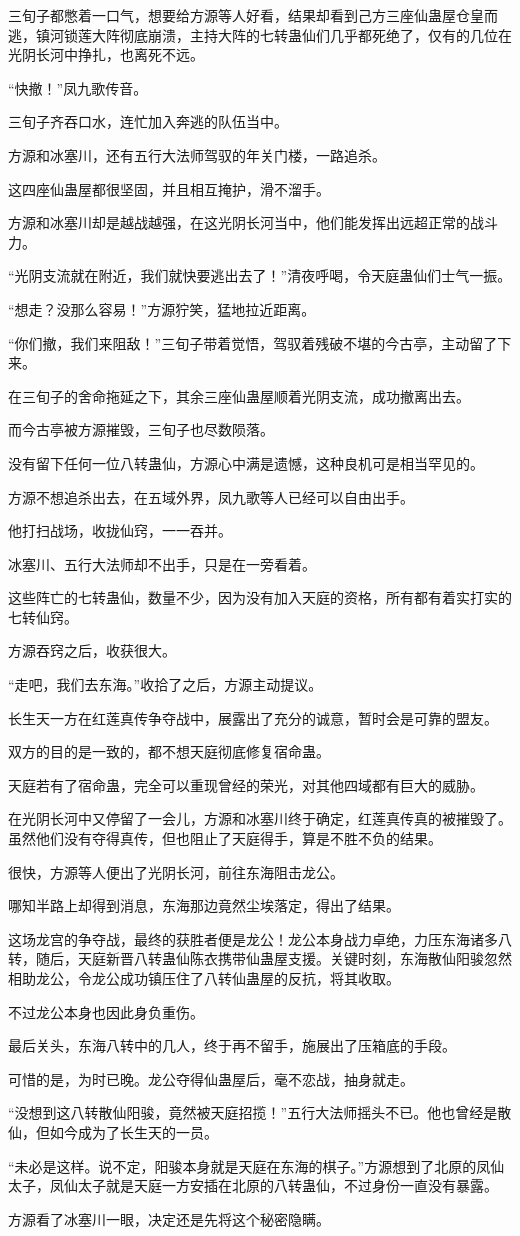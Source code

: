 \begin{this_body}
三旬子都憋着一口气，想要给方源等人好看，结果却看到己方三座仙蛊屋仓皇而逃，镇河锁莲大阵彻底崩溃，主持大阵的七转蛊仙们几乎都死绝了，仅有的几位在光阴长河中挣扎，也离死不远。

“快撤！”凤九歌传音。

三旬子齐吞口水，连忙加入奔逃的队伍当中。

方源和冰塞川，还有五行大法师驾驭的年关门楼，一路追杀。

这四座仙蛊屋都很坚固，并且相互掩护，滑不溜手。

方源和冰塞川却是越战越强，在这光阴长河当中，他们能发挥出远超正常的战斗力。

“光阴支流就在附近，我们就快要逃出去了！”清夜呼喝，令天庭蛊仙们士气一振。

“想走？没那么容易！”方源狞笑，猛地拉近距离。

“你们撤，我们来阻敌！”三旬子带着觉悟，驾驭着残破不堪的今古亭，主动留了下来。

在三旬子的舍命拖延之下，其余三座仙蛊屋顺着光阴支流，成功撤离出去。

而今古亭被方源摧毁，三旬子也尽数陨落。

没有留下任何一位八转蛊仙，方源心中满是遗憾，这种良机可是相当罕见的。

方源不想追杀出去，在五域外界，凤九歌等人已经可以自由出手。

他打扫战场，收拢仙窍，一一吞并。

冰塞川、五行大法师却不出手，只是在一旁看着。

这些阵亡的七转蛊仙，数量不少，因为没有加入天庭的资格，所有都有着实打实的七转仙窍。

方源吞窍之后，收获很大。

“走吧，我们去东海。”收拾了之后，方源主动提议。

长生天一方在红莲真传争夺战中，展露出了充分的诚意，暂时会是可靠的盟友。

双方的目的是一致的，都不想天庭彻底修复宿命蛊。

天庭若有了宿命蛊，完全可以重现曾经的荣光，对其他四域都有巨大的威胁。

在光阴长河中又停留了一会儿，方源和冰塞川终于确定，红莲真传真的被摧毁了。虽然他们没有夺得真传，但也阻止了天庭得手，算是不胜不负的结果。

很快，方源等人便出了光阴长河，前往东海阻击龙公。

哪知半路上却得到消息，东海那边竟然尘埃落定，得出了结果。

这场龙宫的争夺战，最终的获胜者便是龙公！龙公本身战力卓绝，力压东海诸多八转，随后，天庭新晋八转蛊仙陈衣携带仙蛊屋支援。关键时刻，东海散仙阳骏忽然相助龙公，令龙公成功镇压住了八转仙蛊屋的反抗，将其收取。

不过龙公本身也因此身负重伤。

最后关头，东海八转中的几人，终于再不留手，施展出了压箱底的手段。

可惜的是，为时已晚。龙公夺得仙蛊屋后，毫不恋战，抽身就走。

“没想到这八转散仙阳骏，竟然被天庭招揽！”五行大法师摇头不已。他也曾经是散仙，但如今成为了长生天的一员。

“未必是这样。说不定，阳骏本身就是天庭在东海的棋子。”方源想到了北原的凤仙太子，凤仙太子就是天庭一方安插在北原的八转蛊仙，不过身份一直没有暴露。

方源看了冰塞川一眼，决定还是先将这个秘密隐瞒。

\end{this_body}

